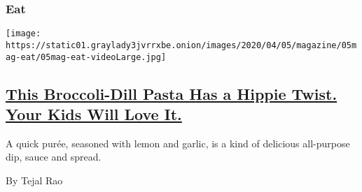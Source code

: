 \begin{enumerate}
{  \subsubsection{Eat}\label{eat}}

  \texttt{[image: https://static01.graylady3jvrrxbe.onion/images/2020/04/05/magazine/05mag-eat/05mag-eat-videoLarge.jpg]}

  \hypertarget{this-broccoli-dill-pasta-has-a-hippie-twist-your-kids-will-love-it}{%
  \subsection{\texorpdfstring{\href{/2020/03/31/magazine/broccoli-dill-pasta-recipe.html}{This
  Broccoli-Dill Pasta Has a Hippie Twist. Your Kids Will Love
  It.}}{This Broccoli-Dill Pasta Has a Hippie Twist. Your Kids Will Love It.}}\label{this-broccoli-dill-pasta-has-a-hippie-twist-your-kids-will-love-it}}

  A quick purée, seasoned with lemon and garlic, is a kind of delicious
  all-purpose dip, sauce and spread.

  By Tejal Rao
\end{enumerate}

